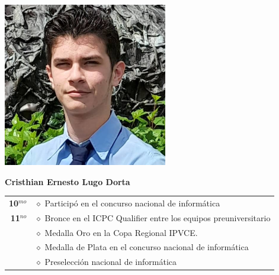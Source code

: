 \vspace*{0.2in}

\begin{minipage}{0.2\textwidth}
	\includegraphics[width=\linewidth]{img/concursantes/cristian.png} %
\end{minipage}
\hfill
\begin{minipage}{0.7\textwidth}
	\textbf{Cristhian Ernesto Lugo Dorta}
	
	\vspace*{0.1in}
	\begin{tabular}{rl}
		
		\textbf{10$^{mo}$} & $\diamond$ Participó en el concurso nacional de informática \\
		
		\textbf{11$^{no}$} 
		& $\diamond$ Bronce en el ICPC Qualifier entre los equipos preuniversitario  \\
		& $\diamond$ Medalla Oro en la Copa Regional IPVCE. \\
		& $\diamond$ Medalla de Plata en el concurso nacional de informática \\
		& $\diamond$ Preselección nacional de informática  \\
		
		
		
		
	\end{tabular}
\end{minipage}

